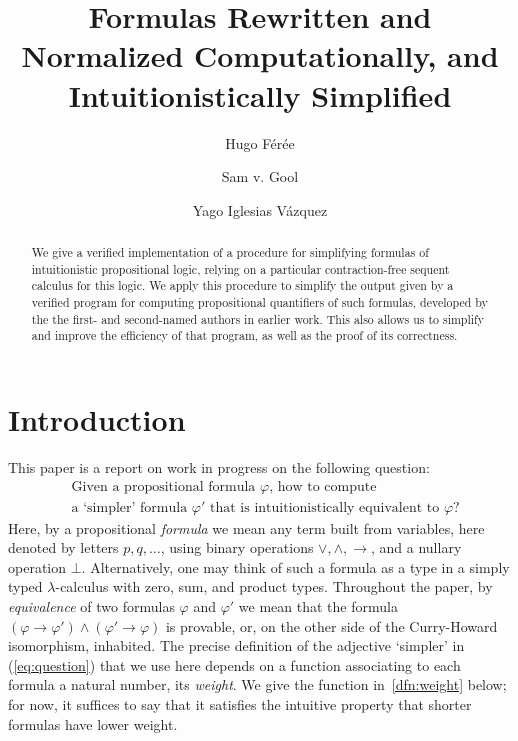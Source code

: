 \documentclass[english,final]{jflart}
\title{Formulas Rewritten and Normalized Computationally, and Intuitionistically Simplified}
\author[1]{Hugo Férée}
\author[1]{Sam v. Gool}
\author[1]{Yago Iglesias Vázquez}
\affil[1]{IRIF, Université Paris Cité, Paris, 75013, France}
\theoremstyle{definition}
\theoremstyle{plain}
\renewcommand{\phi}{\varphi}
\begin{document}
\maketitle

\begin{abstract}
We give a verified implementation of a procedure for simplifying formulas of  intuitionistic propositional logic, relying on a particular contraction-free sequent calculus for this logic. We apply this procedure to simplify the output given by a verified program for computing propositional quantifiers of such formulas, developed by the the first- and second-named authors in earlier work. This also allows us to simplify and improve the efficiency of that program, as well as the proof of its correctness.
\end{abstract}

\section{Introduction}

This paper is a report on work in progress on the following question: 
\begin{equation}\label{eq:question}
\begin{aligned}
&\text{Given a propositional formula $\phi$, how to compute } \\
&\text{a `simpler' formula $\phi'$ that is intuitionistically equivalent to $\phi$?}
\end{aligned}
\end{equation}
Here, by a propositional \emph{formula} we mean any term built from variables, here denoted by letters $p, q, \dots$, using binary operations $\vee, \wedge, \to$, and a nullary operation $\bot$. Alternatively, one may think of such a formula as a type in a simply typed $\lambda$-calculus with zero, sum, and product types. Throughout the paper, by \emph{equivalence} of two formulas $\phi$ and $\phi'$ we mean that the formula $(\phi \to \phi') \wedge (\phi' \to \phi)$ is provable, or, on the other side of the Curry-Howard isomorphism, inhabited. The precise definition of the adjective `simpler' in (\ref{eq:question}) that we use here depends on a function associating to each formula a natural number, its \emph{weight}. We give the function in~\cref{dfn:weight} below; for now, it suffices to say that it satisfies the intuitive property that shorter formulas have lower weight.
\end{document}
